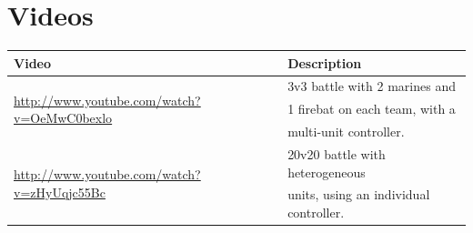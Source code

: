\documentclass[a4paper]{article}
\begin{document}
\section{Videos}
\label{sec:videos}

\begin{center}
\begin{tabular}{|l|l|}
	\hline
	{\bf Video} & {\bf Description}\\ \hline
	\multirow{3}{*}{\small \url{http://www.youtube.com/watch?v=OeMwC0bexlo}} & 3v3 battle with 2 marines and \\
	& 1 firebat on each team, with a \\
	& multi-unit controller. \\ \hline
	\multirow{2}{*}{\small \url{http://www.youtube.com/watch?v=zHyUqjc55Bc}} & 20v20 battle with heterogeneous \\
	& units, using an individual controller. \\ \hline
\end{tabular}
\end{center}
	
	


\end{document}
